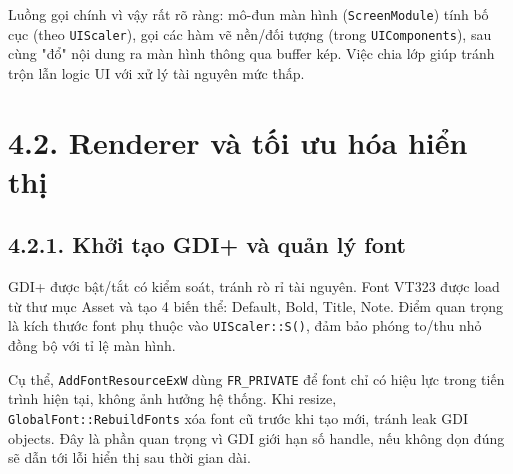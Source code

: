 \setlength{\parindent}{1.5em} Luồng gọi chính vì vậy rất rõ ràng: mô-đun màn hình (\texttt{ScreenModule}) tính bố cục (theo \texttt{UIScaler}), gọi các hàm vẽ nền/đối tượng (trong \texttt{UIComponents}), sau cùng "đổ" nội dung ra màn hình thông qua buffer kép. Việc chia lớp giúp tránh trộn lẫn logic UI với xử lý tài nguyên mức thấp.

\section*{4.2. Renderer và tối ưu hóa hiển thị}

\subsection*{4.2.1. Khởi tạo GDI+ và quản lý font}

\setlength{\parindent}{1.5em} GDI+ được bật/tắt có kiểm soát, tránh rò rỉ tài nguyên. Font VT323 được load từ thư mục Asset và tạo 4 biến thể: Default, Bold, Title, Note. Điểm quan trọng là kích thước font phụ thuộc vào \texttt{UIScaler::S()}, đảm bảo phóng to/thu nhỏ đồng bộ với tỉ lệ màn hình.

\setlength{\parindent}{1.5em} Cụ thể, \texttt{AddFontResourceExW} dùng \texttt{FR\_PRIVATE} để font chỉ có hiệu lực trong tiến trình hiện tại, không ảnh hưởng hệ thống. Khi resize, \texttt{GlobalFont::RebuildFonts} xóa font cũ trước khi tạo mới, tránh leak GDI objects. Đây là phần quan trọng vì GDI giới hạn số handle, nếu không dọn đúng sẽ dẫn tới lỗi hiển thị sau thời gian dài.

